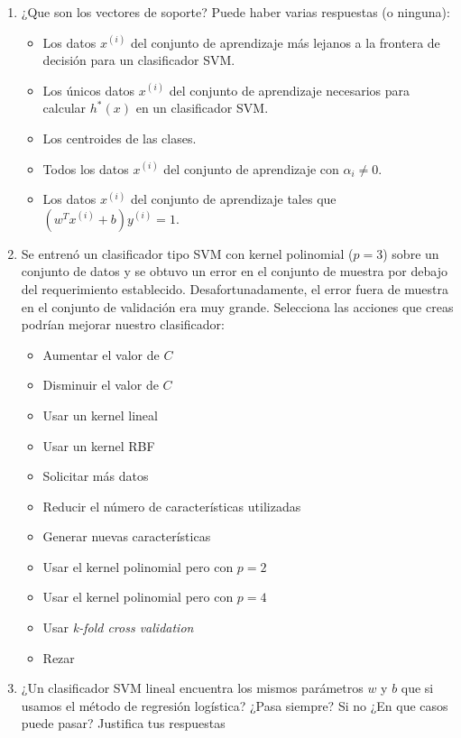 \documentclass[11pt]{article}
\begin{document}
\begin{enumerate}
\item ¿Que son los vectores de soporte? Puede haber varias respuestas (o ninguna):
\begin{itemize}
    \item Los datos $x^{(i)}$ del conjunto de aprendizaje más lejanos a la frontera de decisión para un clasificador SVM.
    \item Los únicos datos $x^{(i)}$ del conjunto de aprendizaje necesarios para calcular $h^*(x)$ en un clasificador SVM.
    \item Los centroides de las clases.
    \item Todos los datos $x^{(i)}$ del conjunto de aprendizaje con $\alpha_i \neq 0$.
    \item Los datos $x^{(i)}$ del conjunto de aprendizaje tales que $(w^T x^{(i)} + b) y^{(i)} = 1$.
\end{itemize}


\item Se entrenó un clasificador tipo SVM con kernel polinomial ($p = 3$) sobre un conjunto de datos y se obtuvo un error en el conjunto de muestra por debajo del requerimiento establecido. Desafortunadamente, el error fuera de muestra en el conjunto de validación era muy grande. Selecciona las acciones que creas podrían mejorar nuestro clasificador:

\begin{itemize}
    \item Aumentar el valor de $C$
    \item Disminuir el valor de $C$
    \item Usar un kernel lineal
    \item Usar un kernel RBF
    \item Solicitar más datos
    \item Reducir el número de características utilizadas
    \item Generar nuevas características
    \item Usar el kernel polinomial pero con $p=2$
    \item Usar el kernel polinomial pero con $p=4$
    \item Usar \emph{k-fold cross validation}
    \item Rezar
\end{itemize}

\item ¿Un clasificador SVM lineal encuentra los mismos parámetros $w$ y $b$ que si usamos el método de regresión logística? ¿Pasa siempre? Si no ¿En que casos puede pasar? Justifica tus respuestas

\end{enumerate}
\end{document}
